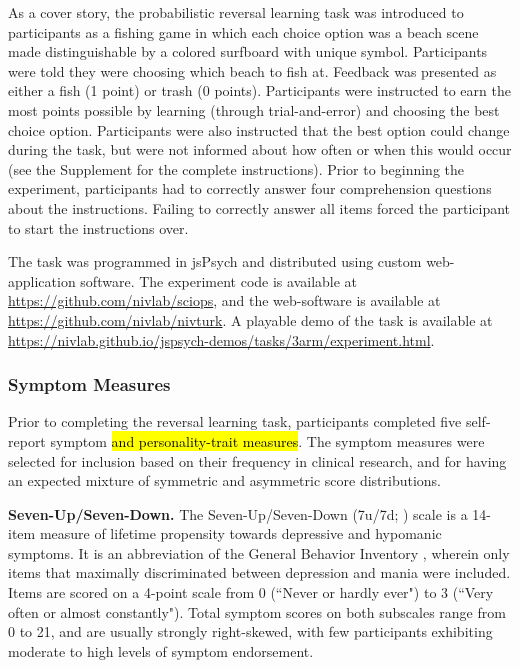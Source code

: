 \documentclass[a4paper,notitlepage,12pt]{article}
\begin{document}
\begin{refsection}[main]
As a cover story, the probabilistic reversal learning task was introduced to participants as a fishing game in which each choice option was a beach scene made distinguishable by a colored surfboard with unique symbol. Participants were told they were choosing which beach to fish at. Feedback was presented as either a fish (1 point) or trash (0 points). Participants were instructed to earn the most points possible by learning (through trial-and-error) and choosing the best choice option. Participants were also instructed that the best option could change during the task, but were not informed about how often or when this would occur (see the Supplement for the complete instructions). Prior to beginning the experiment, participants had to correctly answer four comprehension questions about the instructions. Failing to correctly answer all items forced the participant to start the instructions over.

The task was programmed in jsPsych \cite{deleeuw_2015_jspsych} and distributed using custom web-application software. The experiment code is available at \url{https://github.com/nivlab/sciops}, and the web-software is available at \url{https://github.com/nivlab/nivturk}. A playable demo of the task is available at \url{https://nivlab.github.io/jspsych-demos/tasks/3arm/experiment.html}.

\subsubsection{Symptom Measures}

Prior to completing the reversal learning task, participants completed five self-report symptom \hl{and personality-trait measures}. The symptom measures were selected for inclusion based on their frequency in clinical research, and for having an expected mixture of symmetric and asymmetric score distributions. 

\textbf{Seven-Up/Seven-Down.} The Seven-Up/Seven-Down (7u/7d; \cite{youngstrom_2013_susd}) scale is a 14-item measure of lifetime propensity towards depressive and hypomanic symptoms. It is an abbreviation of the General Behavior Inventory \cite{depue1981behavioral}, wherein only items that maximally discriminated between depression and mania were included. Items are scored on a 4-point scale from 0 (``Never or hardly ever") to 3 (``Very often or almost constantly"). Total symptom scores on both subscales range from 0 to 21, and are usually strongly right-skewed, with few participants exhibiting moderate to high levels of symptom endorsement. 


\end{refsection}
\end{document}
